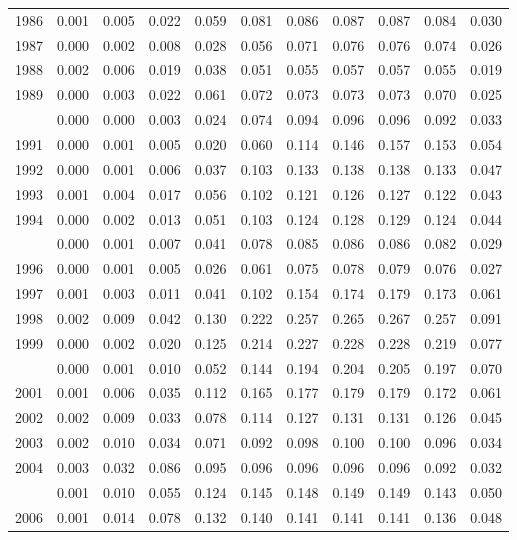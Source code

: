 \documentclass[
]{article}
\begin{document}
\begin{longtable}[t]{lrrrrrrrrrr}
1986 & 0.001 & 0.005 & 0.022 & 0.059 & 0.081 & 0.086 & 0.087 & 0.087 & 0.084 & 0.030\\
1987 & 0.000 & 0.002 & 0.008 & 0.028 & 0.056 & 0.071 & 0.076 & 0.076 & 0.074 & 0.026\\
1988 & 0.002 & 0.006 & 0.019 & 0.038 & 0.051 & 0.055 & 0.057 & 0.057 & 0.055 & 0.019\\
1989 & 0.000 & 0.003 & 0.022 & 0.061 & 0.072 & 0.073 & 0.073 & 0.073 & 0.070 & 0.025\\
\addlinespace
1990 & 0.000 & 0.000 & 0.003 & 0.024 & 0.074 & 0.094 & 0.096 & 0.096 & 0.092 & 0.033\\
1991 & 0.000 & 0.001 & 0.005 & 0.020 & 0.060 & 0.114 & 0.146 & 0.157 & 0.153 & 0.054\\
1992 & 0.000 & 0.001 & 0.006 & 0.037 & 0.103 & 0.133 & 0.138 & 0.138 & 0.133 & 0.047\\
1993 & 0.001 & 0.004 & 0.017 & 0.056 & 0.102 & 0.121 & 0.126 & 0.127 & 0.122 & 0.043\\
1994 & 0.000 & 0.002 & 0.013 & 0.051 & 0.103 & 0.124 & 0.128 & 0.129 & 0.124 & 0.044\\
\addlinespace
1995 & 0.000 & 0.001 & 0.007 & 0.041 & 0.078 & 0.085 & 0.086 & 0.086 & 0.082 & 0.029\\
1996 & 0.000 & 0.001 & 0.005 & 0.026 & 0.061 & 0.075 & 0.078 & 0.079 & 0.076 & 0.027\\
1997 & 0.001 & 0.003 & 0.011 & 0.041 & 0.102 & 0.154 & 0.174 & 0.179 & 0.173 & 0.061\\
1998 & 0.002 & 0.009 & 0.042 & 0.130 & 0.222 & 0.257 & 0.265 & 0.267 & 0.257 & 0.091\\
1999 & 0.000 & 0.002 & 0.020 & 0.125 & 0.214 & 0.227 & 0.228 & 0.228 & 0.219 & 0.077\\
\addlinespace
2000 & 0.000 & 0.001 & 0.010 & 0.052 & 0.144 & 0.194 & 0.204 & 0.205 & 0.197 & 0.070\\
2001 & 0.001 & 0.006 & 0.035 & 0.112 & 0.165 & 0.177 & 0.179 & 0.179 & 0.172 & 0.061\\
2002 & 0.002 & 0.009 & 0.033 & 0.078 & 0.114 & 0.127 & 0.131 & 0.131 & 0.126 & 0.045\\
2003 & 0.002 & 0.010 & 0.034 & 0.071 & 0.092 & 0.098 & 0.100 & 0.100 & 0.096 & 0.034\\
2004 & 0.003 & 0.032 & 0.086 & 0.095 & 0.096 & 0.096 & 0.096 & 0.096 & 0.092 & 0.032\\
\addlinespace
2005 & 0.001 & 0.010 & 0.055 & 0.124 & 0.145 & 0.148 & 0.149 & 0.149 & 0.143 & 0.050\\
2006 & 0.001 & 0.014 & 0.078 & 0.132 & 0.140 & 0.141 & 0.141 & 0.141 & 0.136 & 0.048\\

\end{longtable}
\end{document}
